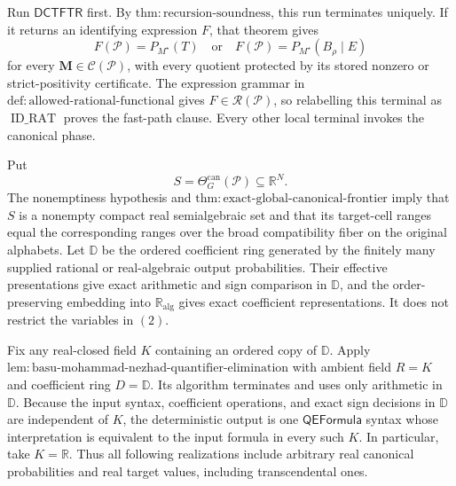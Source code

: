Run \(\mathsf{DCTFTR}\) first.  By \(\mathrm{thm:recursion\text{-}soundness}\), this run terminates uniquely.  If it returns an identifying expression \(F\), that theorem gives
\[
F(\mathcal P)=P_{M^\star}(T)
\quad\text{or}\quad
F(\mathcal P)=P_{M^\star}(B_\rho\mid E)
\tag{1}
\]
for every \(\mathbf M\in\mathcal C(\mathcal P)\), with every quotient protected by its stored nonzero or strict-positivity certificate.  The expression grammar in \(\mathrm{def:allowed\text{-}rational\text{-}functional}\) gives \(F\in\mathscr R(\mathcal P)\), so relabelling this terminal as \(\operatorname{ID\_RAT}\) proves the fast-path clause.  Every other local terminal invokes the canonical phase.

Put
\[
S=\Theta_G^{\mathrm{can}}(\mathcal P)\subseteq\mathbb R^N.
\tag{2}
\]
The nonemptiness hypothesis and \(\mathrm{thm:exact\text{-}global\text{-}canonical\text{-}frontier}\) imply that \(S\) is a nonempty compact real semialgebraic set and that its target-cell ranges equal the corresponding ranges over the broad compatibility fiber on the original alphabets.  Let \(\mathbb D\) be the ordered coefficient ring generated by the finitely many supplied rational or real-algebraic output probabilities.  Their effective presentations give exact arithmetic and sign comparison in \(\mathbb D\), and the order-preserving embedding into \(\mathbb R_{\mathrm{alg}}\) gives exact coefficient representations.  It does not restrict the variables in \((2)\).

Fix any real-closed field \(K\) containing an ordered copy of \(\mathbb D\).  Apply \(\mathrm{lem:basu\text{-}mohammad\text{-}nezhad\text{-}quantifier\text{-}elimination}\) with ambient field \(R=K\) and coefficient ring \(D=\mathbb D\).  Its algorithm terminates and uses only arithmetic in \(\mathbb D\).  Because the input syntax, coefficient operations, and exact sign decisions in \(\mathbb D\) are independent of \(K\), the deterministic output is one \(\mathsf{QEFormula}\) syntax whose interpretation is equivalent to the input formula in every such \(K\).  In particular, take \(K=\mathbb R\).  Thus all following realizations include arbitrary real canonical probabilities and real target values, including transcendental ones.

